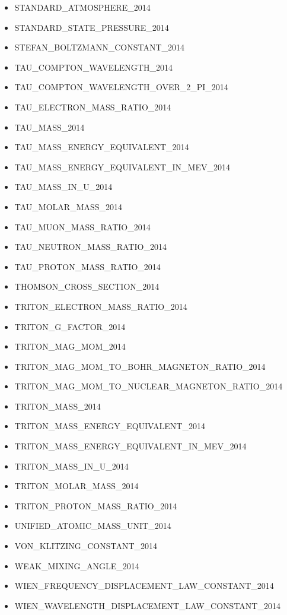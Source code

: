 \begin{itemize}
  STANDARD\_ACCELERATION\_OF\_GRAVITY\_2014
\item
  STANDARD\_ATMOSPHERE\_2014
\item
  STANDARD\_STATE\_PRESSURE\_2014
\item
  STEFAN\_BOLTZMANN\_CONSTANT\_2014
\item
  TAU\_COMPTON\_WAVELENGTH\_2014
\item
  TAU\_COMPTON\_WAVELENGTH\_OVER\_2\_PI\_2014
\item
  TAU\_ELECTRON\_MASS\_RATIO\_2014
\item
  TAU\_MASS\_2014
\item
  TAU\_MASS\_ENERGY\_EQUIVALENT\_2014
\item
  TAU\_MASS\_ENERGY\_EQUIVALENT\_IN\_MEV\_2014
\item
  TAU\_MASS\_IN\_U\_2014
\item
  TAU\_MOLAR\_MASS\_2014
\item
  TAU\_MUON\_MASS\_RATIO\_2014
\item
  TAU\_NEUTRON\_MASS\_RATIO\_2014
\item
  TAU\_PROTON\_MASS\_RATIO\_2014
\item
  THOMSON\_CROSS\_SECTION\_2014
\item
  TRITON\_ELECTRON\_MASS\_RATIO\_2014
\item
  TRITON\_G\_FACTOR\_2014
\item
  TRITON\_MAG\_MOM\_2014
\item
  TRITON\_MAG\_MOM\_TO\_BOHR\_MAGNETON\_RATIO\_2014
\item
  TRITON\_MAG\_MOM\_TO\_NUCLEAR\_MAGNETON\_RATIO\_2014
\item
  TRITON\_MASS\_2014
\item
  TRITON\_MASS\_ENERGY\_EQUIVALENT\_2014
\item
  TRITON\_MASS\_ENERGY\_EQUIVALENT\_IN\_MEV\_2014
\item
  TRITON\_MASS\_IN\_U\_2014
\item
  TRITON\_MOLAR\_MASS\_2014
\item
  TRITON\_PROTON\_MASS\_RATIO\_2014
\item
  UNIFIED\_ATOMIC\_MASS\_UNIT\_2014
\item
  VON\_KLITZING\_CONSTANT\_2014
\item
  WEAK\_MIXING\_ANGLE\_2014
\item
  WIEN\_FREQUENCY\_DISPLACEMENT\_LAW\_CONSTANT\_2014
\item
  WIEN\_WAVELENGTH\_DISPLACEMENT\_LAW\_CONSTANT\_2014
\end{itemize}

